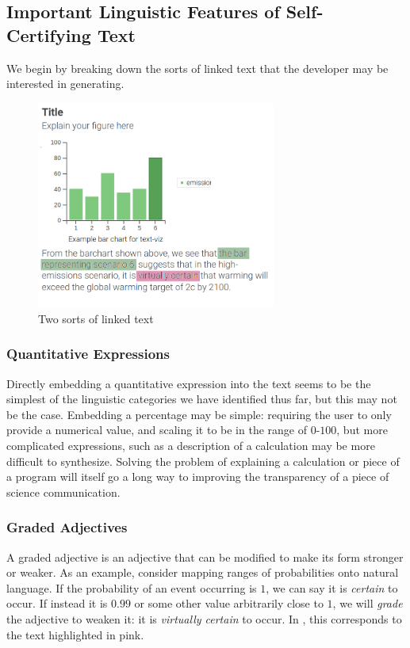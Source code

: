 \subsection{Important Linguistic Features of Self-Certifying Text}
We begin by breaking down the sorts of linked text that the developer may
be interested in generating. 

\begin{figure}
   \includegraphics[width=0.7\textwidth]{fig/text-viz-types.png}
   \caption{Two sorts of linked text}
   \label{fig:linked-text-types}
\end{figure}

\subsubsection{Quantitative Expressions}
Directly embedding a quantitative expression into the text seems to be the simplest
of the linguistic categories we have identified thus far, but this may not be the case. Embedding
a percentage may be simple: requiring the user to only provide a numerical value, and scaling it
to be in the range of $0$-$100$, but more complicated expressions, such as a description of a calculation
may be more difficult to synthesize. Solving the problem of explaining a calculation or piece of a program
will itself go a long way to improving the transparency of a piece of science communication.

\subsubsection{Graded Adjectives}
A graded adjective is an adjective that can be modified to make its form stronger or weaker.
As an example, consider mapping ranges of probabilities onto natural language. If the probability
of an event occurring is $1$, we can say it is \emph{certain} to occur. If instead it is $0.99$
or some other value arbitrarily close to $1$, we will \emph{grade} the adjective to weaken it:
it is \emph{virtually certain} to occur. In , this corresponds to the text
highlighted in pink.

